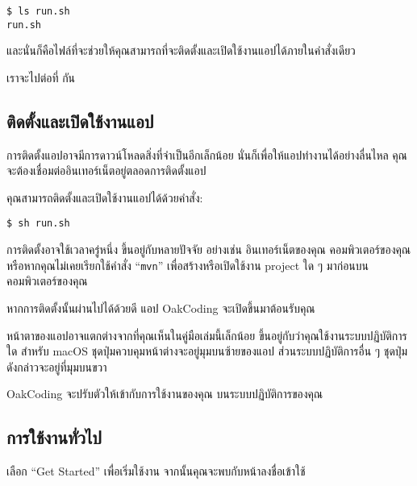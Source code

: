\begin{lstlisting}[numbers=none]
$ ls run.sh
run.sh
\end{lstlisting}

และนั่นก็คือไฟล์ที่จะช่วยให้คุณสามารถที่จะติดตั้งและเปิดใช้งานแอปได้ภายในคำสั่งเดียว

เราจะไปต่อที่  กัน

\pagebreak[4]

\subsection{ติดตั้งและเปิดใช้งานแอป}\label{subsec:launch-app}

\rule{0em}{1ex}

การติดตั้งแอปอาจมีการดาวน์โหลดสิ่งที่จำเป็นอีกเล็กน้อย
นั่นก็เพื่อให้แอปทำงานได้อย่างลื่นไหล
คุณจะต้องเชื่อมต่ออินเทอร์เน็ตอยู่ตลอดการติดตั้งแอป

คุณสามารถติดตั้งและเปิดใช้งานแอปได้ด้วยคำสั่ง:

\begin{lstlisting}[numbers=none]
$ sh run.sh
\end{lstlisting}

การติดตั้งอาจใช้เวลาครู่หนึ่ง ขึ้นอยู่กับหลายปัจจัย อย่างเช่น อินเทอร์เน็ตของคุณ
คอมพิวเตอร์ของคุณ หรือหากคุณไม่เคยเรียกใช้คำสั่ง ``\texttt{mvn}'' เพื่อสร้างหรือเปิดใช้งาน
project ใด ๆ มาก่อนบนคอมพิวเตอร์ของคุณ

หากการติดตั้งนั้นผ่านไปได้ด้วยดี แอป OakCoding จะเปิดขึ้นมาต้อนรับคุณ


หน้าตาของแอปอาจแตกต่างจากที่คุณเห็นในคู่มือเล่มนี้เล็กน้อย
ขึ้นอยู่กับว่าคุณใช้งานระบบปฏิบัติการใด สำหรับ macOS ชุดปุ่มควบคุมหน้าต่างจะอยู่มุมบนซ้ายของแอป
ส่วนระบบปฏิบัติการอื่น ๆ ชุดปุ่มดังกล่าวจะอยู่ที่มุมบนขวา

OakCoding จะปรับตัวให้เข้ากับการใช้งานของคุณ บนระบบปฏิบัติการของคุณ

\pagebreak[4]

\subsection{การใช้งานทั่วไป}\label{subsec:general-usage}


เลือก ``Get Started'' เพื่อเริ่มใช้งาน จากนั้นคุณจะพบกับหน้าลงชื่อเข้าใช้


